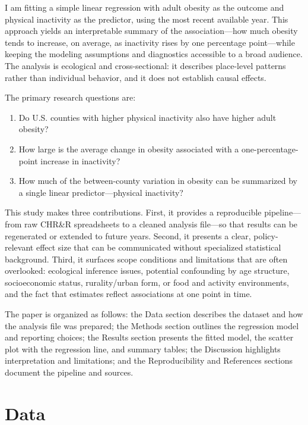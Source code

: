 \documentclass[
  letterpaper,
  DIV=11,
  numbers=noendperiod]{scrartcl}
\begin{document}
I am fitting a simple linear regression with adult obesity as the
outcome and physical inactivity as the predictor, using the most recent
available year. This approach yields an interpretable summary of the
association---how much obesity tends to increase, on average, as
inactivity rises by one percentage point---while keeping the modeling
assumptions and diagnostics accessible to a broad audience. The analysis
is ecological and cross-sectional: it describes place-level patterns
rather than individual behavior, and it does not establish causal
effects.

The primary research questions are:

\begin{enumerate}
\def\labelenumi{\arabic{enumi}.}
\item
  Do U.S. counties with higher physical inactivity also have higher
  adult obesity?
\item
  How large is the average change in obesity associated with a
  one-percentage-point increase in inactivity?
\item
  How much of the between-county variation in obesity can be summarized
  by a single linear predictor---physical inactivity?
\end{enumerate}

This study makes three contributions. First, it provides a reproducible
pipeline---from raw CHR\&R spreadsheets to a cleaned analysis file---so
that results can be regenerated or extended to future years. Second, it
presents a clear, policy-relevant effect size that can be communicated
without specialized statistical background. Third, it surfaces scope
conditions and limitations that are often overlooked: ecological
inference issues, potential confounding by age structure, socioeconomic
status, rurality/urban form, or food and activity environments, and the
fact that estimates reflect associations at one point in time.

The paper is organized as follows: the Data section describes the
dataset and how the analysis file was prepared; the Methods section
outlines the regression model and reporting choices; the Results section
presents the fitted model, the scatter plot with the regression line,
and summary tables; the Discussion highlights interpretation and
limitations; and the Reproducibility and References sections document
the pipeline and sources.

\section{Data}\label{data}
\end{document}
